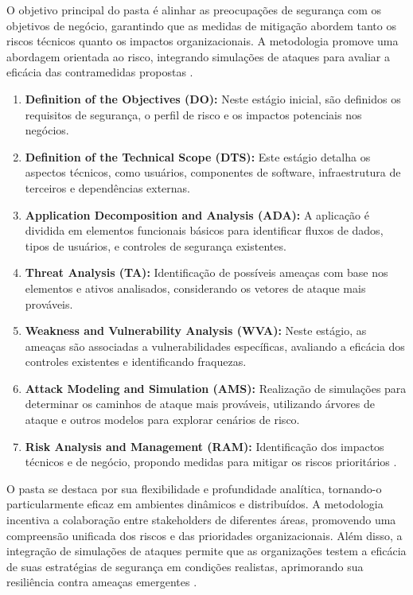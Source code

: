 O objetivo principal do \gls{pasta} é alinhar as preocupações de segurança
com os objetivos de negócio, garantindo que as medidas de mitigação
abordem tanto os riscos técnicos quanto os impactos organizacionais.
A metodologia promove uma abordagem orientada ao risco, integrando
simulações de ataques para avaliar a eficácia das contramedidas
propostas \cite{RiskCentricThreatModeling}.

\begin{enumerate}
    \item \textbf{Definition of the Objectives (DO):} Neste estágio
inicial, são definidos os requisitos de segurança, o perfil de risco e
os impactos potenciais nos negócios.
    \item \textbf{Definition of the Technical Scope (DTS):} Este
estágio detalha os aspectos técnicos, como usuários, componentes de
software, infraestrutura de terceiros e dependências externas.
    \item \textbf{Application Decomposition and Analysis (ADA):} A
aplicação é dividida em elementos funcionais básicos para identificar
fluxos de dados, tipos de usuários, e controles de segurança
existentes.
    \item \textbf{Threat Analysis (TA):} Identificação de possíveis
ameaças com base nos elementos e ativos analisados, considerando os
vetores de ataque mais prováveis.
    \item \textbf{Weakness and Vulnerability Analysis (WVA):} Neste
estágio, as ameaças são associadas a vulnerabilidades específicas,
avaliando a eficácia dos controles existentes e identificando
fraquezas.
    \item \textbf{Attack Modeling and Simulation (AMS):} Realização de
simulações para determinar os caminhos de ataque mais prováveis,
utilizando árvores de ataque e outros modelos para explorar cenários
de risco.
    \item \textbf{Risk Analysis and Management (RAM):} Identificação
dos impactos técnicos e de negócio, propondo medidas para mitigar os
riscos prioritários \cite{RiskCentricThreatModeling}.
\end{enumerate}

O \gls{pasta} se destaca por sua flexibilidade e profundidade analítica,
tornando-o particularmente eficaz em ambientes dinâmicos e
distribuídos. A metodologia incentiva a colaboração entre stakeholders
de diferentes áreas, promovendo uma compreensão unificada dos riscos e
das prioridades organizacionais. Além disso, a integração de
simulações de ataques permite que as organizações testem a eficácia de
suas estratégias de segurança em condições realistas, aprimorando sua
resiliência contra ameaças emergentes
\cite{RiskCentricThreatModeling}.

